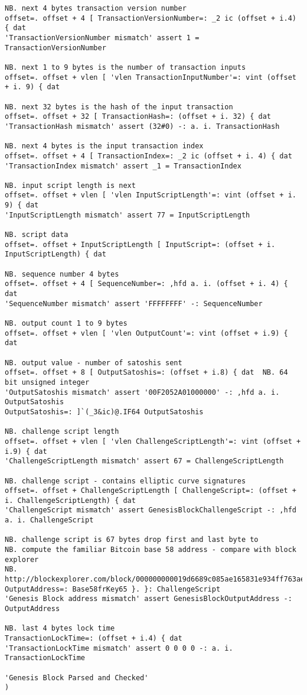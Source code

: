 \begin{lstlisting}[language=jdoc, frame=single,framerule=0pt,label=lst:scr4754X0]
NB. next 4 bytes transaction version number
offset=. offset + 4 [ TransactionVersionNumber=: _2 ic (offset + i.4) { dat
'TransactionVersionNumber mismatch' assert 1 = TransactionVersionNumber

NB. next 1 to 9 bytes is the number of transaction inputs
offset=. offset + vlen [ 'vlen TransactionInputNumber'=: vint (offset + i. 9) { dat

NB. next 32 bytes is the hash of the input transaction
offset=. offset + 32 [ TransactionHash=: (offset + i. 32) { dat
'TransactionHash mismatch' assert (32#0) -: a. i. TransactionHash

NB. next 4 bytes is the input transaction index
offset=. offset + 4 [ TransactionIndex=: _2 ic (offset + i. 4) { dat
'TransactionIndex mismatch' assert _1 = TransactionIndex

NB. input script length is next
offset=. offset + vlen [ 'vlen InputScriptLength'=: vint (offset + i. 9) { dat
'InputScriptLength mismatch' assert 77 = InputScriptLength

NB. script data
offset=. offset + InputScriptLength [ InputScript=: (offset + i. InputScriptLength) { dat

NB. sequence number 4 bytes
offset=. offset + 4 [ SequenceNumber=: ,hfd a. i. (offset + i. 4) { dat
'SequenceNumber mismatch' assert 'FFFFFFFF' -: SequenceNumber

NB. output count 1 to 9 bytes
offset=. offset + vlen [ 'vlen OutputCount'=: vint (offset + i.9) { dat

NB. output value - number of satoshis sent
offset=. offset + 8 [ OutputSatoshis=: (offset + i.8) { dat  NB. 64 bit unsigned integer
'OutputSatoshis mismatch' assert '00F2052A01000000' -: ,hfd a. i. OutputSatoshis
OutputSatoshis=: ]`(_3&ic)@.IF64 OutputSatoshis

NB. challenge script length
offset=. offset + vlen [ 'vlen ChallengeScriptLength'=: vint (offset + i.9) { dat
'ChallengeScriptLength mismatch' assert 67 = ChallengeScriptLength

NB. challenge script - contains elliptic curve signatures
offset=. offset + ChallengeScriptLength [ ChallengeScript=: (offset + i. ChallengeScriptLength) { dat
'ChallengeScript mismatch' assert GenesisBlockChallengeScript -: ,hfd a. i. ChallengeScript

NB. challenge script is 67 bytes drop first and last byte to
NB. compute the familiar Bitcoin base 58 address - compare with block explorer
NB. http://blockexplorer.com/block/000000000019d6689c085ae165831e934ff763ae46a2a6c172b3f1b60a8ce26f
OutputAddress=: Base58frKey65 }. }: ChallengeScript
'Genesis Block address mismatch' assert GenesisBlockOutputAddress -: OutputAddress

NB. last 4 bytes lock time
TransactionLockTime=: (offset + i.4) { dat
'TransactionLockTime mismatch' assert 0 0 0 0 -: a. i. TransactionLockTime

'Genesis Block Parsed and Checked'
)
\end{lstlisting}



%